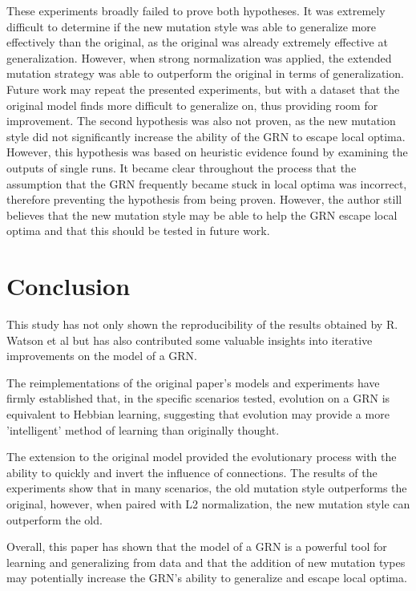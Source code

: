 \documentclass[twocolumn,a4paper,11pt]{article}
\begin{document}
    These experiments broadly failed to prove both hypotheses. It was extremely difficult to determine if the new mutation style was able to generalize more effectively than the original, as the original was already extremely effective at generalization. However, when strong normalization was applied, the extended mutation strategy was able to outperform the original in terms of generalization. Future work may repeat the presented experiments, but with a dataset that the original model finds more difficult to generalize on, thus providing room for improvement. The second hypothesis was also not proven, as the new mutation style did not significantly increase the ability of the GRN to escape local optima. However, this hypothesis was based on heuristic evidence found by examining the outputs of single runs. It became clear throughout the process that the assumption that the GRN frequently became stuck in local optima was incorrect, therefore preventing the hypothesis from being proven. However, the author still believes that the new mutation style may be able to help the GRN escape local optima and that this should be tested in future work.
    
    \section{Conclusion}
    This study has not only shown the reproducibility of the results obtained by R. Watson et al \cite{original-paper} but has also contributed some valuable insights into iterative improvements on the model of a GRN.

    The reimplementations of the original paper's models and experiments have firmly established that, in the specific scenarios tested, evolution on a GRN is equivalent to Hebbian learning, suggesting that evolution may provide a more 'intelligent' method of learning than originally thought.

    The extension to the original model provided the evolutionary process with the ability to quickly and invert the influence of connections. The results of the experiments show that in many scenarios, the old mutation style outperforms the original, however, when paired with L2 normalization, the new mutation style can outperform the old.

    Overall, this paper has shown that the model of a GRN is a powerful tool for learning and generalizing from data and that the addition of new mutation types may potentially increase the GRN's ability to generalize and escape local optima.

    
\end{document}
